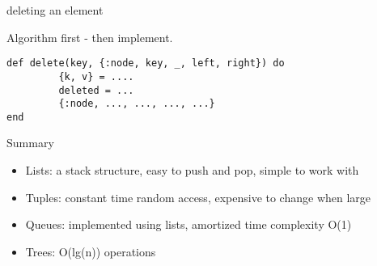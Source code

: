 \begin{frame}[fragile]{deleting an element}

\pause Algorithm first - then implement.

\pause
\begin{verbatim}
def delete(key, {:node, key, _, left, right}) do 
         {k, v} = ....
         deleted = ...
         {:node, ..., ..., ..., ...}
end
\end{verbatim}

\end{frame}

\begin{frame}{Summary}

\begin{itemize}
\item Lists: a stack structure, easy to push and pop, simple to work with 
\item Tuples: constant time random access, expensive to change when large
\item Queues: implemented using lists, amortized time complexity O(1)
\item Trees: O(lg(n)) operations
\end{itemize}


\end{frame}





